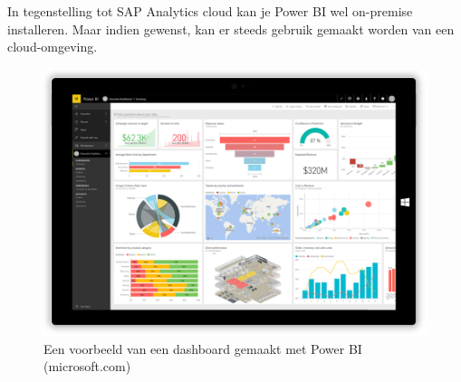 In tegenstelling tot SAP Analytics cloud kan je Power BI wel on-premise installeren. Maar indien gewenst, kan er steeds gebruik gemaakt worden van een cloud-omgeving.

\begin{figure}[h]
	\centering
	\includegraphics[scale=0.45]{../images/powerbi.png}
	\caption{Een voorbeeld van een dashboard gemaakt met Power BI (microsoft.com)}
	\label{fig:powerbi}
\end{figure}
 





